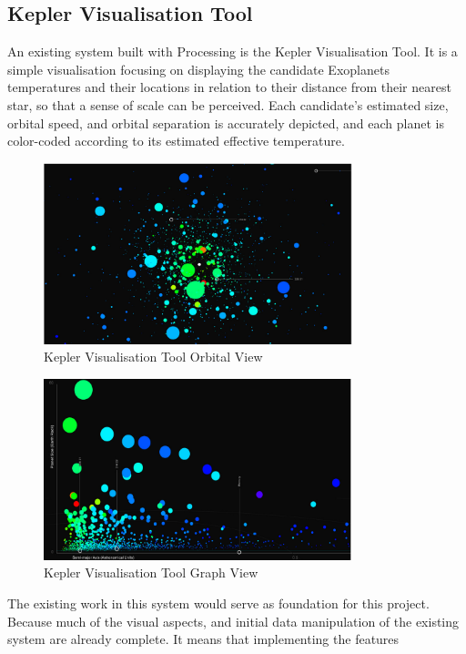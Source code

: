 \subsection{Kepler Visualisation Tool}
An existing system built with Processing is the Kepler Visualisation
Tool\cite{kepler_github, kepler_article}. It is a simple visualisation focusing
on displaying the candidate Exoplanets temperatures and their locations in
relation to their distance from their nearest star, so that a sense of scale can
be perceived. Each candidate’s estimated size, orbital speed, and orbital
separation is accurately depicted, and each planet is color-coded according to
its estimated effective temperature.
\begin{figure}[h!]
  \centering
      \includegraphics[width=0.8\textwidth]{images/kepler_orbital.jpg}
  \caption{Kepler Visualisation Tool Orbital View}
\end{figure}
\begin{figure}[h!]
  \centering
      \includegraphics[width=0.8\textwidth]{images/kepler_graph.jpg}
  \caption{Kepler Visualisation Tool Graph View}
\end{figure}
The existing work in this system would serve as foundation for this project.
Because much of the visual aspects, and initial data manipulation of the
existing system are already complete. It means that implementing the features
